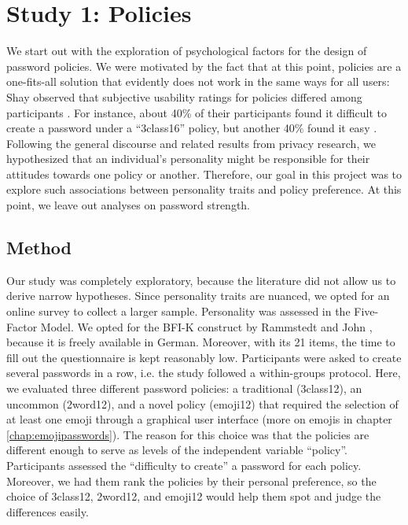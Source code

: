 \section{Study 1: Policies}
We start out with the exploration of psychological factors for the design of password policies. We were motivated by the fact that at this point, policies are a one-fits-all solution that evidently does not work in the same ways for all users: Shay \etal observed that subjective usability ratings for policies differed among participants \cite{Shay2012CorrectHorseBatteryStaple, Shay2014CanLongPasswordsBeSecureAndUsable}. For instance, about 40\% of their participants found it difficult to create a password under a ``3class16'' policy, but another 40\% found it easy \cite{Shay2014CanLongPasswordsBeSecureAndUsable}. Following the general discourse and related results from privacy research, we hypothesized that an individual's personality might be responsible for their attitudes towards one policy or another. Therefore, our goal in this project was to explore such associations between personality traits and policy preference. At this point, we leave out analyses on password strength.
\subsection{Method}
Our study was completely exploratory, because the literature did not allow us to derive narrow hypotheses. Since personality traits are nuanced, we opted for an online survey to collect a larger sample. Personality was assessed in the Five-Factor Model. We opted for the BFI-K construct by Rammstedt and John \cite{Rammstedt2005BFI}, because it is freely available in German. Moreover, with its 21 items, the time to fill out the questionnaire is kept reasonably low. 
Participants were asked to create several passwords in a row, i.e. the study followed a within-groups protocol. Here, we evaluated three different password policies: a traditional (3class12), an uncommon (2word12), and a novel policy (emoji12) that required the selection of at least one emoji through a graphical user interface (more on emojis in chapter \ref{chap:emojipasswords}). The reason for this choice was that the policies are different enough to serve as levels of the independent variable ``policy''. Participants assessed the ``difficulty to create'' a password for each policy. Moreover, we had them rank the policies by their personal preference, so the choice of 3class12, 2word12, and emoji12 would help them spot and judge the differences easily. 


